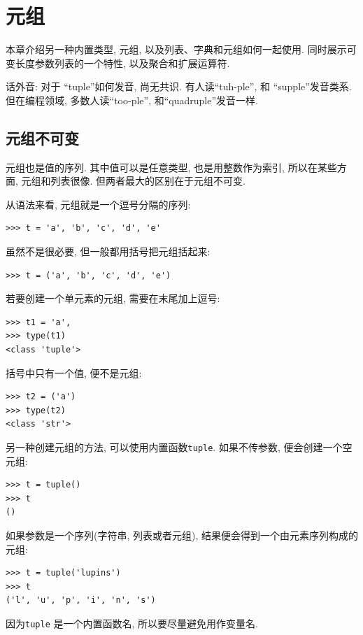 \documentclass[10pt]{book}
\begin{document}
\chapter{元组}
\label{tuplechap}

本章介绍另一种内置类型, 元组, 以及列表、字典和元组如何一起使用. 
同时展示可变长度参数列表的一个特性, 以及聚合和扩展运算符. 

话外音: 对于 ``tuple''如何发音, 尚无共识. 有人读``tuh-ple'', 
和 ``supple''发音类系. 
但在编程领域, 多数人读``too-ple'', 和``quadruple''发音一样. 


\section{元组不可变}

元组也是值的序列. 其中值可以是任意类型, 也是用整数作为索引, 
所以在某些方面, 元组和列表很像. 
但两者最大的区别在于元组不可变. 

从语法来看, 元组就是一个逗号分隔的序列:

\begin{verbatim}
>>> t = 'a', 'b', 'c', 'd', 'e'
\end{verbatim}
%
虽然不是很必要, 但一般都用括号把元组括起来:

\begin{verbatim}
>>> t = ('a', 'b', 'c', 'd', 'e')
\end{verbatim}
%
若要创建一个单元素的元组, 需要在末尾加上逗号:

\begin{verbatim}
>>> t1 = 'a',
>>> type(t1)
<class 'tuple'>
\end{verbatim}
%
括号中只有一个值, 便不是元组:

\begin{verbatim}
>>> t2 = ('a')
>>> type(t2)
<class 'str'>
\end{verbatim}
%
另一种创建元组的方法, 可以使用内置函数{\tt tuple}. 
如果不传参数, 便会创建一个空元组:

\begin{verbatim}
>>> t = tuple()
>>> t
()
\end{verbatim}
%
如果参数是一个序列(字符串, 列表或者元组), 
结果便会得到一个由元素序列构成的元组:

\begin{verbatim}
>>> t = tuple('lupins')
>>> t
('l', 'u', 'p', 'i', 'n', 's')
\end{verbatim}
%
因为{\tt tuple} 是一个内置函数名, 
所以要尽量避免用作变量名. 
\end{document}
